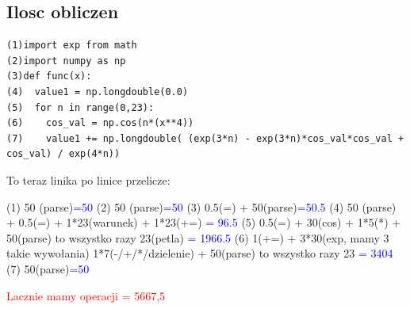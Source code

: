 \documentclass[a4paper,8pt]{article}
\begin{document}
\subsection{Ilosc obliczen}
\begin{lstlisting}
(1)import exp from math
(2)import numpy as np
(3)def func(x):
(4)  value1 = np.longdouble(0.0)
(5)  for n in range(0,23):
(6)    cos_val = np.cos(n*(x**4))
(7)    value1 += np.longdouble( (exp(3*n) - exp(3*n)*cos_val*cos_val + cos_val) / exp(4*n))
\end{lstlisting}
To teraz linika po linice przelicze:
\begin{flushleft}
(1) 50 (parse)\textcolor{blue}{=50}
\newline
\newline
(2) 50 (parse)\textcolor{blue}{=50}
\newline
\newline
(3) 0.5(=) + 50(parse)\textcolor{blue}{=50.5}
\newline
\newline
(4) 50 (parse) + 0.5(=) + 1*23(warunek) + 1*23(+=) \textcolor{blue}{= 96.5}
\newline
\newline
(5) 0.5(=) + 30(cos) + 1*5(*) + 50(parse) to wszystko razy 23(petla) \textcolor{blue}{= 1966.5}
\newline
\newline
(6) 1(+=) + 3*30(exp, mamy 3 takie wywołania) 1*7(-/+/*/dzielenie) + 50(parse) to wszystko razy 23 \textcolor{blue}{= 3404}
\newline
\newline
(7) 50(parse)\textcolor{blue}{=50}
\newline
\newline

\textcolor{red}{Lacznie mamy operacji = 5667,5}
\end{flushleft}
\end{document}
